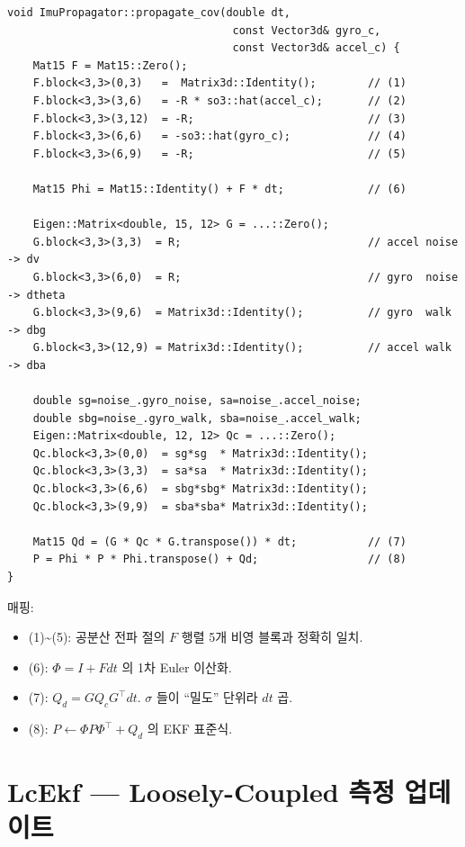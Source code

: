 \documentclass[11pt,a4paper,oneside]{report}
\newcommand{\T}{^{\!\top}}
\begin{document}
\begin{lstlisting}[style=cpp,caption={\texttt{imu\_propagator.cpp:89-125}}]
void ImuPropagator::propagate_cov(double dt,
                                   const Vector3d& gyro_c,
                                   const Vector3d& accel_c) {
    Mat15 F = Mat15::Zero();
    F.block<3,3>(0,3)   =  Matrix3d::Identity();        // (1)
    F.block<3,3>(3,6)   = -R * so3::hat(accel_c);       // (2)
    F.block<3,3>(3,12)  = -R;                           // (3)
    F.block<3,3>(6,6)   = -so3::hat(gyro_c);            // (4)
    F.block<3,3>(6,9)   = -R;                           // (5)

    Mat15 Phi = Mat15::Identity() + F * dt;             // (6)

    Eigen::Matrix<double, 15, 12> G = ...::Zero();
    G.block<3,3>(3,3)  = R;                             // accel noise -> dv
    G.block<3,3>(6,0)  = R;                             // gyro  noise -> dtheta
    G.block<3,3>(9,6)  = Matrix3d::Identity();          // gyro  walk  -> dbg
    G.block<3,3>(12,9) = Matrix3d::Identity();          // accel walk  -> dba

    double sg=noise_.gyro_noise, sa=noise_.accel_noise;
    double sbg=noise_.gyro_walk, sba=noise_.accel_walk;
    Eigen::Matrix<double, 12, 12> Qc = ...::Zero();
    Qc.block<3,3>(0,0)  = sg*sg  * Matrix3d::Identity();
    Qc.block<3,3>(3,3)  = sa*sa  * Matrix3d::Identity();
    Qc.block<3,3>(6,6)  = sbg*sbg* Matrix3d::Identity();
    Qc.block<3,3>(9,9)  = sba*sba* Matrix3d::Identity();

    Mat15 Qd = (G * Qc * G.transpose()) * dt;           // (7)
    P = Phi * P * Phi.transpose() + Qd;                 // (8)
}
\end{lstlisting}

매핑:
\begin{itemize}
\item (1)\textasciitilde{}(5): 공분산 전파 절의 \(F\) 행렬 5개 비영 블록과 정확히 일치.
\item (6): \(\Phi = I + F dt\) 의 1차 Euler 이산화.
\item (7): \(Q_d = G Q_c G\T dt\). \(\sigma\) 들이 ``밀도'' 단위라 \(dt\) 곱.
\item (8): \(P \leftarrow \Phi P \Phi\T + Q_d\) 의 EKF 표준식.
\end{itemize}

\section{LcEkf — Loosely-Coupled 측정 업데이트}
\end{document}
